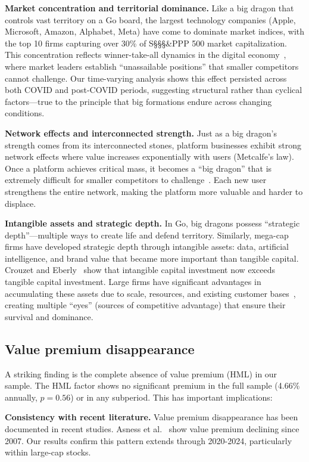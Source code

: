 \documentclass[10pt,letterpaper]{article}
\begin{document}
\textbf{Market concentration and territorial dominance.} Like a big dragon that controls vast territory on a Go board, the largest technology companies (Apple, Microsoft, Amazon, Alphabet, Meta) have come to dominate market indices, with the top 10 firms capturing over 30\% of S\S\S\S\&PPP 500 market capitalization. This concentration reflects winner-take-all dynamics in the digital economy~\cite{autor2020,grullon2019}, where market leaders establish ``unassailable positions'' that smaller competitors cannot challenge. Our time-varying analysis shows this effect persisted across both COVID and post-COVID periods, suggesting structural rather than cyclical factors---true to the principle that big formations endure across changing conditions.

\textbf{Network effects and interconnected strength.} Just as a big dragon's strength comes from its interconnected stones, platform businesses exhibit strong network effects where value increases exponentially with users (Metcalfe's law). Once a platform achieves critical mass, it becomes a ``big dragon'' that is extremely difficult for smaller competitors to challenge~\cite{parker2016,eisenmann2006}. Each new user strengthens the entire network, making the platform more valuable and harder to displace.

\textbf{Intangible assets and strategic depth.} In Go, big dragons possess ``strategic depth''---multiple ways to create life and defend territory. Similarly, mega-cap firms have developed strategic depth through intangible assets: data, artificial intelligence, and brand value that became more important than tangible capital. Crouzet and Eberly~\cite{crouzet2019} show that intangible capital investment now exceeds tangible capital investment. Large firms have significant advantages in accumulating these assets due to scale, resources, and existing customer bases~\cite{haskel2018}, creating multiple ``eyes'' (sources of competitive advantage) that ensure their survival and dominance.

\subsection*{Value premium disappearance}

A striking finding is the complete absence of value premium (HML) in our sample. The HML factor shows no significant premium in the full sample (4.66\% annually, $p=0.56$) or in any subperiod. This has important implications:

\textbf{Consistency with recent literature.} Value premium disappearance has been documented in recent studies. Asness et al.~\cite{asness2018} show value premium declining since 2007. Our results confirm this pattern extends through 2020-2024, particularly within large-cap stocks.
\end{document}
